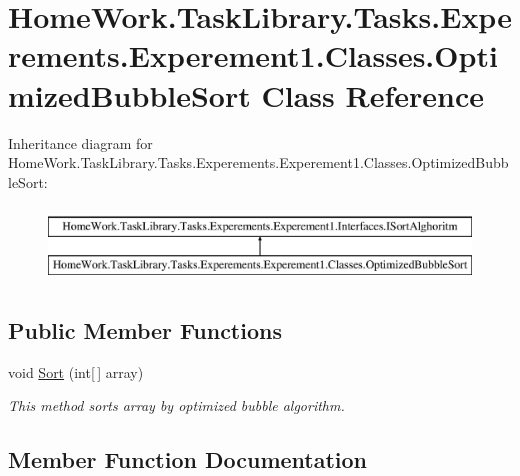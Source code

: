 \hypertarget{class_home_work_1_1_task_library_1_1_tasks_1_1_experements_1_1_experement1_1_1_classes_1_1_optimized_bubble_sort}{}\section{Home\+Work.\+Task\+Library.\+Tasks.\+Experements.\+Experement1.\+Classes.\+Optimized\+Bubble\+Sort Class Reference}
\label{class_home_work_1_1_task_library_1_1_tasks_1_1_experements_1_1_experement1_1_1_classes_1_1_optimized_bubble_sort}
Inheritance diagram for Home\+Work.\+Task\+Library.\+Tasks.\+Experements.\+Experement1.\+Classes.\+Optimized\+Bubble\+Sort\+:\begin{figure}[H]
\begin{center}
\leavevmode
\includegraphics[height=2.000000cm]{class_home_work_1_1_task_library_1_1_tasks_1_1_experements_1_1_experement1_1_1_classes_1_1_optimized_bubble_sort}
\end{center}
\end{figure}
\subsection*{Public Member Functions}
\begin{DoxyCompactItemize}
\item 
void \mbox{\hyperlink{class_home_work_1_1_task_library_1_1_tasks_1_1_experements_1_1_experement1_1_1_classes_1_1_optimized_bubble_sort_a3a792130b978052c24628a4d476637c9}{Sort}} (int\mbox{[}$\,$\mbox{]} array)
\begin{DoxyCompactList}\small\item\em This method sorts array by optimized bubble algorithm. \end{DoxyCompactList}\end{DoxyCompactItemize}


\subsection{Member Function Documentation}
\mbox{\label{class_home_work_1_1_task_library_1_1_tasks_1_1_experements_1_1_experement1_1_1_classes_1_1_optimized_bubble_sort_a3a792130b978052c24628a4d476637c9}} 
